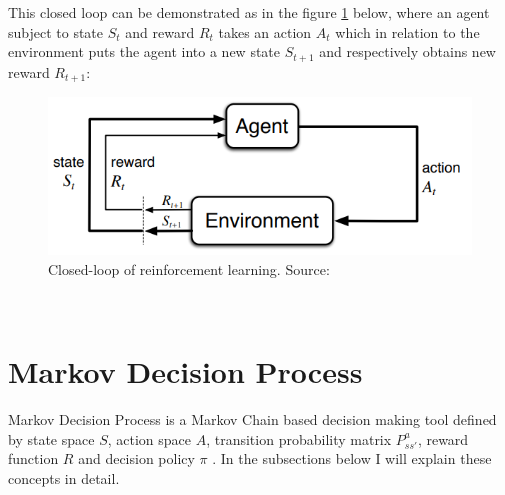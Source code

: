 This closed loop can be demonstrated as in the figure \ref{fig:closed_loop} below, where an agent subject to state $S_{t}$
and reward $R_{t}$ takes an action $A_{t}$ which 
in relation to the environment puts the agent
into a new state $S_{t+1}$ and respectively obtains new reward $R_{t+1}$:

\begin{figure}[h!]
  \centering
  \includegraphics[scale=0.7]{figures/closed_loop.PNG}
  \caption{Closed-loop of reinforcement learning. Source: \cite{sutton_barto}}
  \label{fig:closed_loop}
\end{figure}\\  


 
\section{Markov Decision Process}

Markov Decision Process is a Markov Chain based decision making
tool defined by state space $S$, action space $A$, transition 
probability matrix $P^{a}_{ss'}$, reward 
function $R$ and decision policy $\pi$ \cite{lecture_mdp}. In 
the subsections below I will explain these concepts in detail.

